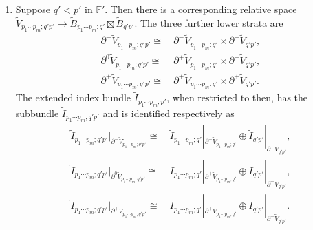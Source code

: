 \documentclass[reqno, 10pt]{amsart}
\numberwithin{equation}{section}
\numberwithin{equation}{section}
\theoremstyle{definition}
\theoremstyle{remark}
\newcommand{\beqn}{\begin{equation*}}
\newcommand{\eeqn}{\end{equation*}}
\newcommand{\mb}{\mathbb}
\newcommand{\wt}{\widetilde}
\begin{document}
\begin{enumerate}
\begin{multline*}
    \cong \wt I_{p_j q_j}|_{\partial^+ \wt V_{p_j q_j}} \oplus \wt I_{p_1 \cdots p_{j-1} q_j p_{j+1} \cdots p_m; p'}|_{\partial^- \wt V_{p_1 \cdots p_{j-1} q_j p_{j+1} \cdots p_m; p'}},
    \end{multline*}
    and
    \begin{multline*}
    \wt I_{p_1 \cdots p_{j-1} (p_j q_j) p_{j+1} \cdots p_m; p'}|_{\partial^+ \wt V_{p_1 \cdots p_{j-1} (p_j q_j) p_{j+1} \cdots p_m; p'}} \\
    \cong \wt I_{p_j q_j}|_{\partial^+ \wt V_{p_j q_j}} \oplus \wt I_{p_1 \cdots p_{j-1} q_j p_{j+1} \cdots p_m; p'}|_{\partial^+ \wt V_{p_1 \cdots p_{j-1} q_j p_{j+1} \cdots p_m; p'}}.
    \end{multline*}

    \item Suppose $q' < p'$ in ${\mb F}'$. Then there is a corresponding relative space $\wt V_{p_1 \cdots p_m; q'p'} \to \wt B_{p_1 \cdots p_m; q'} \boxtimes \wt B_{q'p'}$. The three further lower strata are 
    \beqn
    \begin{split}
        \partial^- \wt V_{p_1 \cdots p_m; q'p'} \cong &\ \partial^- \wt V_{p_1 \cdots p_m; q'} \times \partial^- \wt V_{q'p'},\\
        \partial^0 \wt V_{p_1 \cdots p_m; q'p'} \cong &\ \partial^+ \wt V_{p_1 \cdots p_m; q'} \times \partial^- \wt V_{q'p'},\\
        \partial^+ \wt V_{p_1 \cdots p_m; q'p'} \cong &\ \partial^+ \wt V_{p_1 \cdots p_m; q'} \times \partial^+ \wt V_{q'p'}.
    \end{split}
    \eeqn
    The extended index bundle $\wt I_{p_1 \cdots p_m; p'}$, when restricted to then, has the subbundle $\wt I_{p_1 \cdots p_m; q'p'}$ and is identified respectively as 
    \beqn
    \begin{split}
       \wt I_{p_1 \cdots p_m; q'p'}|_{\partial^- \wt V_{p_1 \cdots p_m; q'p'}} \cong &\  \wt I_{p_1 \cdots p_m; q'}|_{\partial^- \wt V_{p_1 \cdots p_m; q'}} \oplus \wt I_{q'p'}|_{\partial^- \wt V_{q'p'}},\\
       \wt I_{p_1 \cdots p_m; q'p'}|_{\partial^0 \wt V_{p_1 \cdots p_m; q'p'}} \cong &\ \wt I_{p_1 \cdots p_m; q'}|_{\partial^+ \wt V_{p_1 \cdots p_m; q'}} \oplus \wt I_{q'p'}|_{\partial^- \wt V_{q'p'}},\\
        \wt I_{p_1 \cdots p_m; q'p'}|_{\partial^+ \wt V_{p_1 \cdots p_m; q'p'}} \cong &\ \wt I_{p_1 \cdots p_m; q'}|_{\partial^+ \wt V_{p_1 \cdots p_m; q'}} \oplus \wt I_{q'p'}|_{\partial^+ \wt V_{q'p'}}.
    \end{split}
    \eeqn
\end{enumerate}
\end{document}
